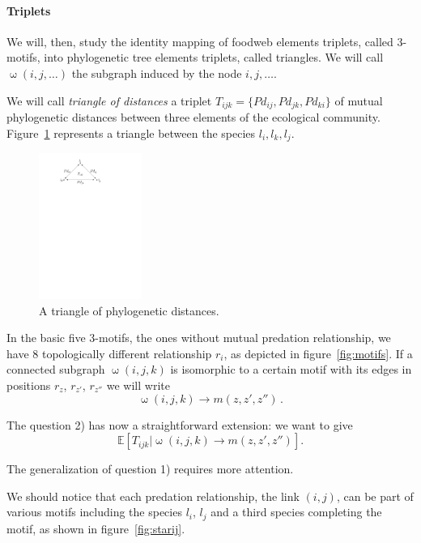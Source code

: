 \documentclass[12pt,a4paper]{report}
\begin{document}
\paragraph{Triplets}
We will, then, study the identity mapping of foodweb elements triplets, called 3-motifs, into phylogenetic tree elements triplets, called triangles. We will call $\upomega(i,j,\dots)$ the subgraph induced by the node $i,j,\dots$.

We will call \emph{triangle of distances} a triplet $T_{ijk}=\{Pd_{ij},Pd_{jk},Pd_{ki}\}$ of mutual phylogenetic distances between three elements of the ecological community. Figure~\ref{fig:phylogenetictriplets} represents a triangle between the species $l_i, l_k, l_j$.

\begin{figure}[h]
	\centering
		\includegraphics[width=0.3\textwidth]{images/phylogenetictriplets}
		\caption{A triangle of phylogenetic distances.}
		\label{fig:phylogenetictriplets}
\end{figure}

In the basic five 3-motifs, the ones without mutual predation relationship, we have 8 topologically different relationship $r_i$, as depicted in figure~\ref{fig:motifs}. If a connected subgraph $\upomega(i,j,k)$ is isomorphic to a certain motif with its edges in positions $r_z$, $r_{z'}$, $r_{z''}$ we will write \[\upomega(i,j,k) \to m(z,z',z'') \, .\]

The question 2) has now a straightforward extension: we want to give \[\mathbb{E}\left[T_{ijk}|\upomega(i,j,k) \to m(z,z',z'')\right].\]

The generalization of question 1) requires more attention.

We should notice that each predation relationship, the link $(i,j)$, can be part of various motifs including the species $l_i$, $l_j$ and a third species completing the motif, as shown in figure~\ref{fig:starij}.
\end{document}
